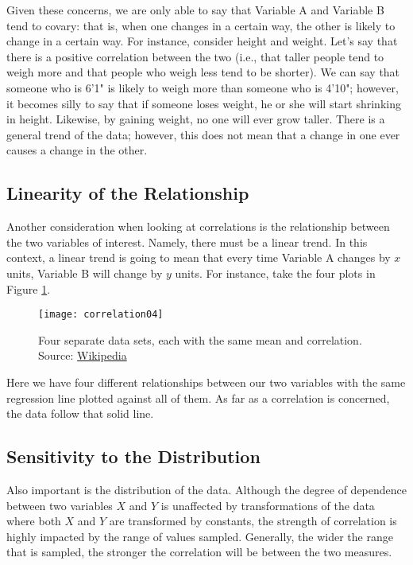 Given these concerns, we are only able to say that Variable A and Variable B tend to covary: that is, when one changes in a certain way, the other is likely to change in a certain way. For instance, consider height and weight. Let's say that there is a positive correlation between the two (i.e., that taller people tend to weigh more and that people who weigh less tend to be shorter). We can say that someone who is 6'1" is likely to weigh more than someone who is 4'10"; however, it becomes silly to say that if someone loses weight, he or she will start shrinking in height. Likewise, by gaining weight, no one will ever grow taller. There is a general trend of the data; however, this does not mean that a change in one ever causes a change in the other.

\subsection{Linearity of the Relationship}
Another consideration when looking at correlations is the relationship between the two variables of interest. Namely, there must be a linear trend. In this context, a linear trend is going to mean that every time Variable A changes by $x$ units, Variable B will change by $y$ units. For instance, take the four plots in Figure \ref{fig:correlation04}.

\begin{figure}[htp]
	\texttt{[image: correlation04]}
	\caption{Four separate data sets, each with the same mean and correlation. Source: \href{http://en.wikipedia.org/wiki/Correlation}{Wikipedia}}
	\label{fig:correlation04}
\end{figure}

Here we have four different relationships between our two variables with the same regression line plotted against all of them. As far as a correlation is concerned, the data follow that solid line.

\subsection{Sensitivity to the Distribution}
Also important is the distribution of the data. Although the degree of dependence between two variables $X$ and $Y$ is unaffected by transformations of the data where both $X$ and $Y$ are transformed by constants, the strength of correlation is highly impacted by the range of values sampled. Generally, the wider the range that is sampled, the stronger the correlation will be between the two measures.


